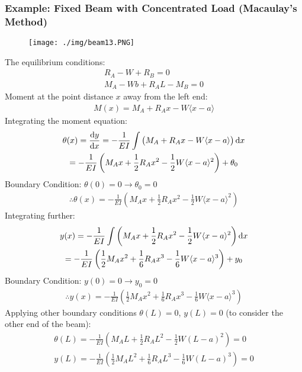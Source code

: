 \subsubsection{Example: Fixed Beam with Concentrated Load (Macaulay's Method)}
\begin{figure}[H]
  \centering
  \texttt{[image: ./img/beam13.PNG]}
\end{figure}
The equilibrium conditions:
\begin{gather}
  R_A-W+R_B = 0 \\
  M_A-Wb+R_AL-M_B = 0
\end{gather}
Moment at the point distance $x$ away from the left end:
\begin{gather}
  M(x) = M_A+R_Ax-W\langle x-a \rangle
\end{gather}
Integrating the moment equation:
\begin{gather}
  \theta(x) = \frac{\dif y}{\dif x} = -\frac{1}{EI}\int\left(M_A+R_Ax-W\langle x-a \rangle\right) \dif x \\
  = -\frac{1}{EI}\left(M_Ax+\frac{1}{2}R_Ax^2-\frac{1}{2}W\langle x-a\rangle^2\right) + \theta_0
\end{gather}
Boundary Condition: $\theta(0) = 0 \longrightarrow \theta_0 = 0$
\begin{gather}
  \therefore \theta(x) = -\frac{1}{EI}\left(M_Ax+\frac{1}{2}R_Ax^2-\frac{1}{2}W\langle x-a\rangle^2\right)
\end{gather}
Integrating further:
\begin{gather}
  y(x) = -\frac{1}{EI}\int\left(M_Ax+\frac{1}{2}R_Ax^2-\frac{1}{2}W\langle x-a\rangle^2\right) \dif x \\
  = -\frac{1}{EI}\left(\frac{1}{2}M_Ax^2+\frac{1}{6}R_Ax^3-\frac{1}{6}W\langle x-a \rangle^3\right) + y_0
\end{gather}
Boundary Condition: $y(0) = 0 \longrightarrow y_0 = 0$
\begin{gather}
  \therefore y(x) = -\frac{1}{EI}\left(\frac{1}{2}M_Ax^2+\frac{1}{6}R_Ax^3-\frac{1}{6}W\langle x-a \rangle^3\right)
\end{gather}
Applying other boundary conditions $\theta(L) = 0$, $y(L) = 0$ (to consider the other end of the beam):
\begin{gather}
  \theta(L) = -\frac{1}{EI}\left(M_AL+\frac{1}{2}R_AL^2-\frac{1}{2}W(L-a)^2\right) = 0 \\
  y(L) = -\frac{1}{EI}\left(\frac{1}{2}M_AL^2+\frac{1}{6}R_AL^3-\frac{1}{6}W(L-a)^3\right) = 0
\end{gather}
